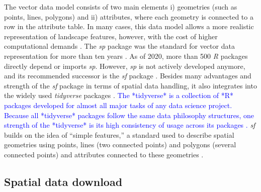 \documentclass[smallextended]{svjour3}       %
\begin{document}
The vector data model consists of two main elements i) geometries (such as points, lines, polygons) and ii) attributes, where each geometry is connected to a row in the attribute table.
In many cases, this data model allows a more realistic representation of landscape features, however, with the cost of higher computational demands \cite{Lovelace2019}.
The \emph{sp} package was the standard for vector data representation for more than ten years \cite{Pebesma2005,Bivand2013}.
As of 2020, more than 500 \emph{R} packages directly depend or imports \emph{sp}.
However, \emph{sp} is not actively developed anymore, and its recommended successor is the \emph{sf} package \cite{Pebesma2018}.
Besides many advantages and strength of the \emph{sf} package in terms of spatial data handling, it also integrates into the widely used \emph{tidyverse} packages \cite{Wickham2019}.
\textcolor{blue}{The *tidyverse* is a collection of *R* packages developed for almost all major tasks of any data science project. 
Because all *tidyverse* packages follow the same data philosophy structures, one strength of the *tidyverse* is its high consistency of usage across its packages \cite{Wickham2019}.}
\emph{sf} builds on the idea of ``simple features,'' a standard used to describe spatial geometries using points, lines (two connected points) and polygons (several connected points) and attributes connected to these geometries \cite{Pebesma2019a}.

\hypertarget{spatial-data-download}{%
\subsection{Spatial data download}\label{spatial-data-download}}
\end{document}
